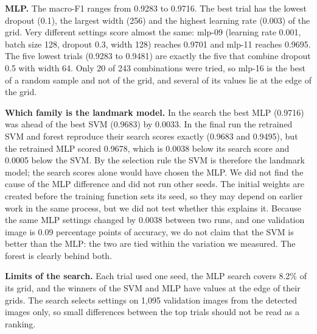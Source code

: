 \textbf{MLP.} The macro-F1 ranges from 0.9283 to 0.9716. The best trial has the lowest dropout (0.1), the largest width (256) and the highest learning rate (0.003) of the grid. Very different settings score almost the same: mlp-09 (learning rate 0.001, batch size 128, dropout 0.3, width 128) reaches 0.9701 and mlp-11 reaches 0.9695. The five lowest trials (0.9283 to 0.9481) are exactly the five that combine dropout 0.5 with width 64. Only 20 of 243 combinations were tried, so mlp-16 is the best of a random sample and not of the grid, and several of its values lie at the edge of the grid.

\textbf{Which family is the landmark model.} In the search the best MLP (0.9716) was ahead of the best SVM (0.9683) by 0.0033. In the final run the retrained SVM and forest reproduce their search scores exactly (0.9683 and 0.9495), but the retrained MLP scored 0.9678, which is 0.0038 below its search score and 0.0005 below the SVM. By the selection rule the SVM is therefore the landmark model; the search scores alone would have chosen the MLP. We did not find the cause of the MLP difference and did not run other seeds. The initial weights are created before the training function sets its seed, so they may depend on earlier work in the same process, but we did not test whether this explains it. Because the same MLP settings changed by 0.0038 between two runs, and one validation image is 0.09 percentage points of accuracy, we do not claim that the SVM is better than the MLP: the two are tied within the variation we measured. The forest is clearly behind both.

\textbf{Limits of the search.} Each trial used one seed, the MLP search covers 8.2\% of its grid, and the winners of the SVM and MLP have values at the edge of their grids. The search selects settings on 1{,}095 validation images from the detected images only, so small differences between the top trials should not be read as a ranking.